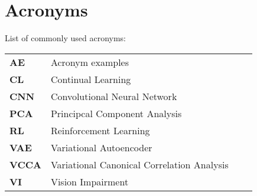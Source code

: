 
\chapter{Acronyms}
\label{chap:acronyms}

List of commonly used acronyms: \\

\begin{tabular}{llll}
	\textbf{AE}			&	Acronym examples \\
	\textbf{CL}			& 	Continual Learning \\
	\textbf{CNN}		& 	Convolutional Neural Network \\
	\textbf{PCA}		& 	Principcal Component Analysis \\
	\textbf{RL}			& 	Reinforcement Learning \\
	\textbf{VAE}		&	Variational Autoencoder \\
	\textbf{VCCA}		&	Variational Canonical Correlation Analysis \\
	\textbf{VI} 		&	Vision Impairment \\
\end{tabular}